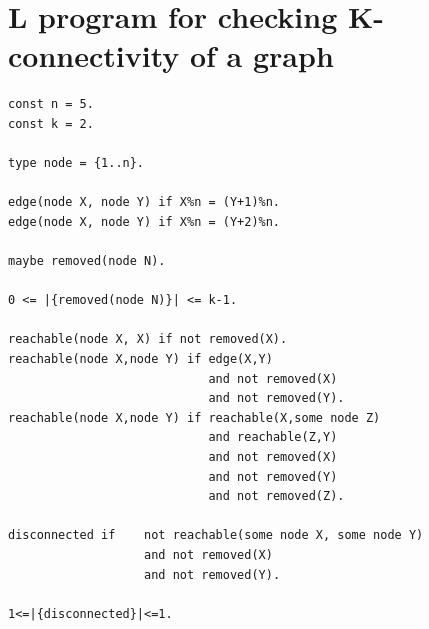 \documentclass[a4paper,10pt]{article}
\begin{document}
\section{L program for checking K-connectivity of a graph}\label{B}
\begin{verbatim}
const n = 5.
const k = 2.

type node = {1..n}.

edge(node X, node Y) if X%n = (Y+1)%n.
edge(node X, node Y) if X%n = (Y+2)%n.

maybe removed(node N).

0 <= |{removed(node N)}| <= k-1.

reachable(node X, X) if not removed(X).
reachable(node X,node Y) if edge(X,Y) 
                            and not removed(X) 
                            and not removed(Y). 
reachable(node X,node Y) if reachable(X,some node Z)
                            and reachable(Z,Y) 
                            and not removed(X) 
                            and not removed(Y) 
                            and not removed(Z).

disconnected if    not reachable(some node X, some node Y) 
                   and not removed(X)
                   and not removed(Y).                

1<=|{disconnected}|<=1.
\end{verbatim}
%
%
\end{document}
